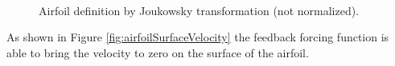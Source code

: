 \documentclass[12pt]{aiaa-pretty}
\begin{document}
%
	\begin{figure}[H]
		\centering
		\quad
		\\
		\quad
		\caption{Airfoil definition by Joukowsky transformation (not normalized).}
		\label{fig:flowOverAirfoil}
	\end{figure}
%

As shown in Figure \ref{fig:airfoilSurfaceVelocity} the feedback forcing function is able to bring the velocity to zero on the surface of the airfoil.
\end{document}

